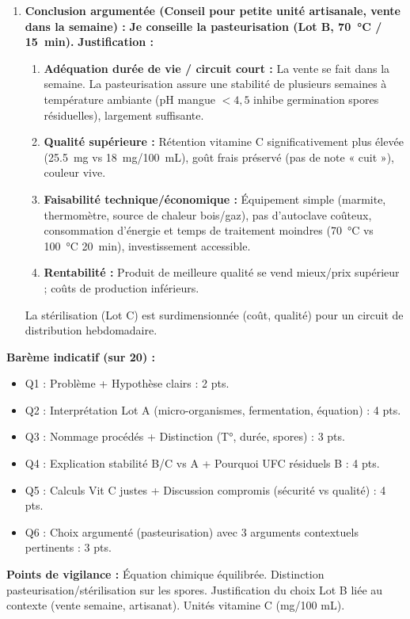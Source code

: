 \documentclass[11pt]{article}
\begin{document}
\begin{corrige}
\begin{enumerate}
\item \textbf{Conclusion argumentée (Conseil pour petite unité artisanale, vente dans la semaine) :}
\textbf{Je conseille la pasteurisation (Lot B, \SI{70}{\degreeCelsius} / \SI{15}{\minute}).}
\textbf{Justification :}
\begin{enumerate}
\item \textbf{Adéquation durée de vie / circuit court :} La vente se fait dans la semaine. La pasteurisation assure une stabilité de plusieurs semaines à température ambiante (pH mangue $< 4,5$ inhibe germination spores résiduelles), largement suffisante.
\item \textbf{Qualité supérieure :} Rétention vitamine C significativement plus élevée (\SI{25,5}{\mg} vs \SI{18}{\mg}/\SI{100}{\mL}), goût frais préservé (pas de note « cuit »), couleur vive.
\item \textbf{Faisabilité technique/économique :} Équipement simple (marmite, thermomètre, source de chaleur bois/gaz), pas d'autoclave coûteux, consommation d'énergie et temps de traitement moindres (\SI{70}{\degreeCelsius} vs \SI{100}{\degreeCelsius} \SI{20}{\minute}), investissement accessible.
\item \textbf{Rentabilité :} Produit de meilleure qualité se vend mieux/prix supérieur ; coûts de production inférieurs.
\end{enumerate}
La stérilisation (Lot C) est surdimensionnée (coût, qualité) pour un circuit de distribution hebdomadaire.
\end{enumerate}

\vspace{0,5cm}
\noindent\textbf{Barème indicatif (sur 20) :}
\begin{itemize}
\item Q1 : Problème + Hypothèse clairs : 2 pts.
\item Q2 : Interprétation Lot A (micro-organismes, fermentation, équation) : 4 pts.
\item Q3 : Nommage procédés + Distinction (T°, durée, spores) : 3 pts.
\item Q4 : Explication stabilité B/C vs A + Pourquoi UFC résiduels B : 4 pts.
\item Q5 : Calculs Vit C justes + Discussion compromis (sécurité vs qualité) : 4 pts.
\item Q6 : Choix argumenté (pasteurisation) avec 3 arguments contextuels pertinents : 3 pts.
\end{itemize}
\textbf{Points de vigilance :} Équation chimique \ce{} équilibrée. Distinction pasteurisation/stérilisation sur les spores. Justification du choix Lot B liée au contexte (vente semaine, artisanat). Unités vitamine C (mg/100 mL).
\end{corrige}
\end{document}
